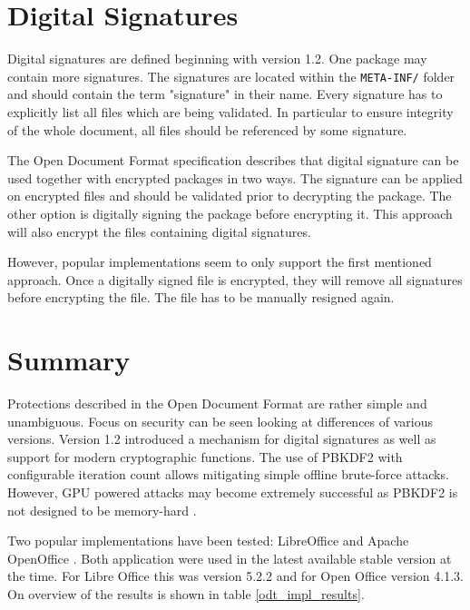 \documentclass[11pt,oneside]{fithesis2}
\begin{document}
\section{Digital Signatures}

Digital signatures are defined beginning with version 1.2. One package may contain more signatures. The signatures are located within the \texttt{META-INF/} folder and should contain the term "signature" in their name. Every signature has to explicitly list all files which are being validated. In particular to ensure integrity of the whole document, all files should be referenced by some signature. 

The Open Document Format specification describes that digital signature can be used together with encrypted packages in two ways. The signature can be applied on encrypted files and should be validated prior to decrypting the package. The other option is digitally signing the package before encrypting it. This approach will also encrypt the files containing digital signatures.  

However, popular implementations seem to only support the first mentioned approach. Once a digitally signed file is encrypted, they will remove all signatures before encrypting the file. The file has to be manually resigned again. 

\section{Summary}

Protections described in the Open Document Format are rather simple and unambiguous. Focus on security can be seen looking at differences of various versions. Version 1.2 introduced a mechanism for digital signatures as well as support for modern cryptographic functions. The use of PBKDF2 with configurable iteration count allows mitigating simple offline brute-force attacks. However, GPU powered attacks may become extremely successful as PBKDF2 is not designed to be memory-hard \cite{PBKDF2_attack}.

Two popular implementations have been tested: LibreOffice \cite{libreoffice} and Apache OpenOffice \cite{openoffice}. Both application were used in the latest available stable version at the time. For Libre Office this was version 5.2.2 and for Open Office version 4.1.3. On overview of the results is shown in table \ref{odt_impl_results}.
\end{document}
